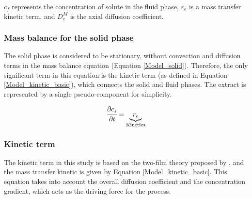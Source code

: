 \documentclass[../Article_Model_Parameters.tex]{subfiles}
\begin{document}
	$c_f$ represents the concentration of solute in the fluid phase, $r_e$ is a mass transfer kinetic term, and $D^M_e$ is the axial diffusion coefficient.
	
	\subsubsection{Mass balance for the solid phase} \label{Mass_balance_solid}
	
	The solid phase is considered to be stationary, without convection and diffusion terms in the mass balance equation (Equation \ref{Model_solid}). Therefore, the only significant term in this equation is the kinetic term (as defined in Equation \ref{Model_kinetic_basic}), which connects the solid and fluid phases. The extract is represented by a single pseudo-component for simplicity. 
	
	{\footnotesize
		\begin{equation} 
			\label{Model_solid}
					\cfrac{\partial c_s}{\partial t} = \underbrace{ r_e }_{\text{Kinetics}}
			\end{equation} }
			
	\subsubsection{Kinetic term} \label{CH: Kinetic}
	
	
	The kinetic term in this study is based on the two-film theory proposed by \citet{Reverchon1996}, and the mass transfer kinetic is given by Equation \ref{Model_kinetic_basic}. This equation takes into account the overall diffusion coefficient and the concentration gradient, which acts as the driving force for the process.
	
\end{document}
